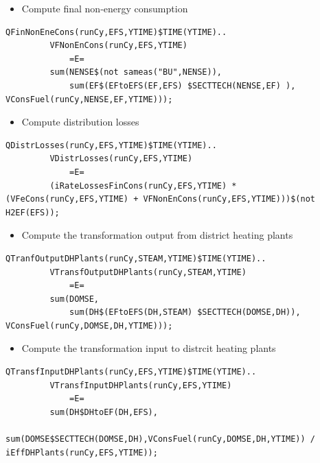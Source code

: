 \documentclass[a4paper,]{scrartcl}
\providecommand{\tightlist}{%
  \setlength{\itemsep}{0pt}\setlength{\parskip}{0pt}}
\begin{document}
\begin{itemize}
\tightlist
\item
  Compute final non-energy consumption
\end{itemize}

\begin{lstlisting}
QFinNonEneCons(runCy,EFS,YTIME)$TIME(YTIME)..
         VFNonEnCons(runCy,EFS,YTIME)
             =E=
         sum(NENSE$(not sameas("BU",NENSE)),
             sum(EF$(EFtoEFS(EF,EFS) $SECTTECH(NENSE,EF) ), VConsFuel(runCy,NENSE,EF,YTIME)));  
\end{lstlisting}

\begin{itemize}
\tightlist
\item
  Compute distribution losses
\end{itemize}

\begin{lstlisting}
QDistrLosses(runCy,EFS,YTIME)$TIME(YTIME)..
         VDistrLosses(runCy,EFS,YTIME)
             =E=
         (iRateLossesFinCons(runCy,EFS,YTIME) * (VFeCons(runCy,EFS,YTIME) + VFNonEnCons(runCy,EFS,YTIME)))$(not H2EF(EFS));  
\end{lstlisting}

\begin{itemize}
\tightlist
\item
  Compute the transformation output from district heating plants
\end{itemize}

\begin{lstlisting}
QTranfOutputDHPlants(runCy,STEAM,YTIME)$TIME(YTIME)..
         VTransfOutputDHPlants(runCy,STEAM,YTIME)
             =E=
         sum(DOMSE,
             sum(DH$(EFtoEFS(DH,STEAM) $SECTTECH(DOMSE,DH)), VConsFuel(runCy,DOMSE,DH,YTIME)));
\end{lstlisting}

\begin{itemize}
\tightlist
\item
  Compute the transformation input to distrcit heating plants
\end{itemize}

\begin{lstlisting}
QTransfInputDHPlants(runCy,EFS,YTIME)$TIME(YTIME)..
         VTransfInputDHPlants(runCy,EFS,YTIME)
             =E=
         sum(DH$DHtoEF(DH,EFS),
             sum(DOMSE$SECTTECH(DOMSE,DH),VConsFuel(runCy,DOMSE,DH,YTIME)) / iEffDHPlants(runCy,EFS,YTIME));   
\end{lstlisting}
\end{document}
